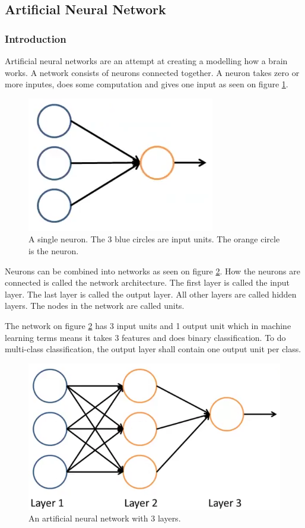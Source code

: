
\subsection{Artificial Neural Network}
\subsubsection{Introduction}

Artificial neural networks are an attempt at creating a modelling how a brain works.
A network consists of neurons connected together. 
A neuron takes zero or more inputes, does some computation and gives one input as seen on figure \ref{fig:neuron}.

\begin{figure}[H]
\centering
\includegraphics[scale=.5]{billeder/neuron}
\caption{A single neuron. The 3 blue circles are input units. The orange circle is the neuron.}
\label{fig:neuron}
\end{figure}

Neurons can be combined into networks as seen on figure \ref{fig:neural-network}.
How the neurons are connected is called the network architecture.
The first layer is called the input layer.
The last layer is called the output layer.
All other layers are called hidden layers.
The nodes in the network are called units.

The network on figure \ref{fig:neural-network} has 3 input units and 1 output unit which in machine learning terms means it takes 3 features and does binary classification.
To do multi-class classification, the output layer shall contain one output unit per class.

\begin{figure}[H]
\centering
\includegraphics[scale=.5]{billeder/neural-network}
\caption{An artificial neural network with 3 layers.}
\label{fig:neural-network}
\end{figure}

